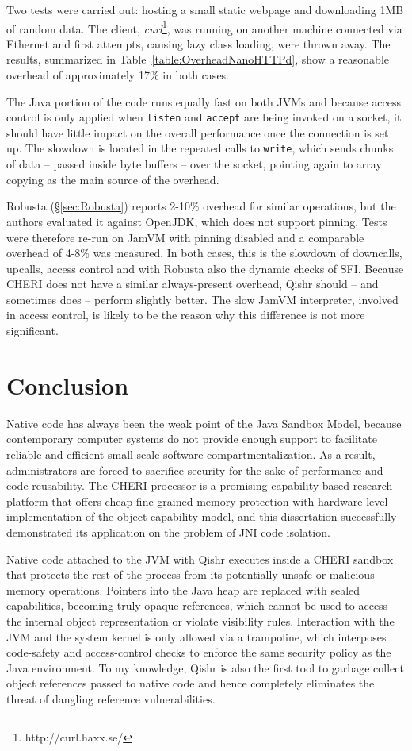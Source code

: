 \documentclass[a4paper,12pt,twoside,openright]{report}
\begin{document}
Two tests were carried out: hosting a small static webpage and downloading 1MB of random data. The client, \emph{curl}\footnote{http://curl.haxx.se/}, was running on another machine connected via Ethernet and first attempts, causing lazy class loading, were thrown away. The results, summarized in Table~\ref{table:OverheadNanoHTTPd}, show a reasonable overhead of approximately 17\% in both cases.

The Java portion of the code runs equally fast on both JVMs and because access control is only applied when \texttt{listen} and \texttt{accept} are being invoked on a socket, it should have little impact on the overall performance once the connection is set up. The slowdown is located in the repeated calls to \texttt{write}, which sends chunks of data -- passed inside byte buffers -- over the socket, pointing again to array copying as the main source of the overhead.

Robusta (\S\ref{sec:Robusta}) reports 2-10\% overhead for similar operations, but the authors evaluated it against OpenJDK, which does not support pinning. Tests were therefore re-run on JamVM with pinning disabled and a comparable overhead of 4-8\% was measured. In both cases, this is the slowdown of downcalls, upcalls, access control and with Robusta also the dynamic checks of SFI. Because CHERI does not have a similar always-present overhead, Qishr should -- and sometimes does -- perform slightly better. The slow JamVM interpreter, involved in access control, is likely to be the reason why this difference is not more significant.

\chapter{Conclusion} 

Native code has always been the weak point of the Java Sandbox Model, because contemporary computer systems do not provide enough support to facilitate reliable and efficient small-scale software compartmentalization. As a result, administrators are forced to sacrifice security for the sake of performance and code reusability. The CHERI processor is a promising capability-based research platform that offers cheap fine-grained memory protection with hardware-level implementation of the object capability model, and this dissertation successfully demonstrated its application on the problem of JNI code isolation.

Native code attached to the JVM with Qishr executes inside a CHERI sandbox that protects the rest of the process from its potentially unsafe or malicious memory operations. Pointers into the Java heap are replaced with sealed capabilities, becoming truly opaque references, which cannot be used to access the internal object representation or violate visibility rules. Interaction with the JVM and the system kernel is only allowed via a trampoline, which interposes code-safety and access-control checks to enforce the same security policy as the Java environment. To my knowledge, Qishr is also the first tool to garbage collect object references passed to native code and hence completely eliminates the threat of dangling reference vulnerabilities.
\end{document}
